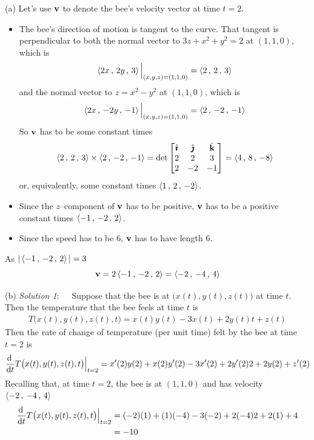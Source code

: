 \begin{solution}
(a) Let's use $\mathbf{v}$ to denote the bee's velocity vector at time $t=2$.
\begin{itemize}
\item 
The bee's direction of motion is tangent to the curve.
That tangent is perpendicular to both the normal vector to
$3z + x^2 + y^2 = 2$ at $(1,1,0)$, which is 
\begin{equation*}
\left< 2x\,,\,2y\,,\,3\right>\Big|_{(x,y,z)=(1,1,0)} = \left< 2\,,\,2\,,\,3\right>
\end{equation*}
and the normal vector to $z = x^2 - y^2$ at $(1,1,0)$, which is 
\begin{equation*}
\left< 2x\,,\,-2y\,,\,-1\right>\Big|_{(x,y,z)=(1,1,0)} = \left< 2\,,\,-2\,,\,-1\right>
\end{equation*}
So $\mathbf{v}$ has to be some constant times
\begin{align*}
\left< 2\,,\,2\,,\,3\right> \times \left< 2\,,\,-2\,,\,-1\right>
    =\det\left[\begin{matrix}
            \hat{\pmb{\imath}}  &  \hat{\pmb{\jmath}}  &  \hat{\mathbf{k}} \\
            2    &   2   &    3 \\
            2    &  -2   &   -1 
            \end{matrix}\right]
=\left< 4 \,,\, 8 \,,\, -8 \right>
\end{align*}
or, equivalently, some constant times $\left< 1 \,,\, 2 \,,\, -2 \right>$.

\item
Since the $z$--component of $\mathbf{v}$ has to be positive,
$\mathbf{v}$ has to be a positive constant times 
$\left< -1 \,,\, -2 \,,\, 2 \right>$.

\item
Since the speed has to be $6$,  $\mathbf{v}$ has to have length $6$.
\end{itemize}
As $|\left< -1 \,,\, -2 \,,\, 2 \right>|=3$
\begin{equation*}
\mathbf{v} = 2\left< -1 \,,\, -2 \,,\, 2 \right>
    =\left< -2 \,,\, -4 \,,\, 4 \right>
\end{equation*}

(b) \emph{Solution 1}:\ \ \ 
Suppose that the bee is at $\big(x(t),y(t),z(t)\big)$ at time $t$.
Then the temperature that the bee feels at time $t$ is
\begin{align*}
T\big(x(t),y(t),z(t),t\big) = x(t) y(t) -3x(t) +2y(t) t +z(t)
\end{align*}
Then the rate of change of temperature (per unit time) felt by the bee at time
$t=2$ is
\begin{align*}
\diff{}{t}T\big(x(t),y(t),z(t),t\big)\Big|_{t=2}
&=x'(2)y(2) + x(2)y'(2) -3x'(2) +2y'(2)2+2y(2) +z'(2) \\
\end{align*}
Recalling that, at time $t=2$, the bee is at $(1,1,0)$ and has velocity
$\left< -2 \,,\, -4 \,,\, 4 \right>$
\begin{align*}
\diff{}{t}T\big(x(t),y(t),z(t),t\big)\Big|_{t=2}
&=(-2)(1) + (1)(-4) -3(-2) +2(-4)2+2(1) +4 \\
&=-10
\end{align*}



\end{solution}
